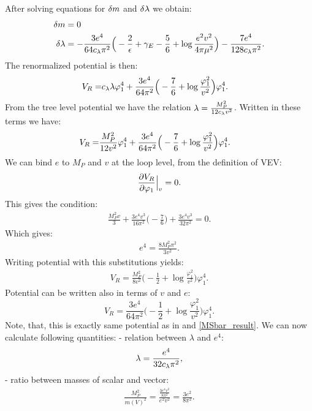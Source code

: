 After solving equations for $\delta m$ and $\delta\lambda$ we obtain:
\begin{align}
\delta m &= 0 \\
\delta\lambda &= -\frac{3e^4}{64c_\lambda\pi^2}\Big(-\frac{2}{\epsilon}+\gamma_E-\frac{5}{6}+
\log\frac{e^2v^2}{4\pi\mu^2}\Big)-\frac{7e^4}{128c_\lambda\pi^2}.
\end{align}
The renormalized potential is then:
\begin{align}
V_R = &c_\lambda\lambda\varphi_1^4 +
\frac{3e^4}{64\pi^2}\Big(-\frac{7}{6}+\log\frac{\varphi_1^2}{v^2}\Big)\varphi_1^4.
\end{align}
From the tree level potential we have the relation $\lambda = \frac{M_P^2}{12c_\lambda v^2}$. 
Written in these terms we have:
\begin{align}
V_R = &\frac{M_P^2}{12v^2}\varphi_1^4 +
\frac{3e^4}{64\pi^2}\Big(-\frac{7}{6}+\log\frac{\varphi_1^2}{v^2}\Big)\varphi_1^4.
\end{align}
We can bind $e$ to $M_P$ and $v$ at the loop level, from the definition of VEV:
\begin{align}
\frac{\partial V_R}{\partial \varphi_1} \Big|_v= 0.
\end{align}
This gives the condition:
\begin{align}
\frac{M_P^2v}{3}+\frac{3e^4v^3}{16\pi^2}\Big(-\frac{7}{6}\Big)+\frac{3e^4v^3}{32\pi^2}=0.
\end{align}
Which gives:
\begin{align}
e^4 = \frac{8M_P^2\pi^2}{3v^2}.
\end{align}
Writing potential with this substitutions yields:
\begin{align}
V_R = \frac{M_P^2}{8v^2}\Big(-\frac{1}{2}+\log\frac{\varphi_1^2}{v^2}\Big)\varphi_1^4.
\end{align}
Potential can be written also in terms of $v$ and $e$:
\begin{equation}
V_R=\frac{3e^4}{64\pi^2}\Big(-\frac{1}{2}+\log\frac{\varphi_1^2}{v^2}\Big)\varphi_1^4.
\end{equation}
Note, that, this is exactly same potential as in \cite{Coleman1973} and \ref{MSbar_result}. 
We can now calculate following quantities:
\hspace*{0.5cm}- relation between $\lambda$ and $e^4$:
\begin{align}
\lambda = \frac{e^4}{32c_\lambda\pi^2},
\end{align}
\hspace*{0.5cm}- ratio between masses of scalar and vector:
\begin{align}
\frac{M_P^2}{m(V)^2} = \frac{\frac{3e^4v^2}{8\pi^2}}{e^2v^2} = \frac{3e^2}{8\pi^2}.
\end{align}

